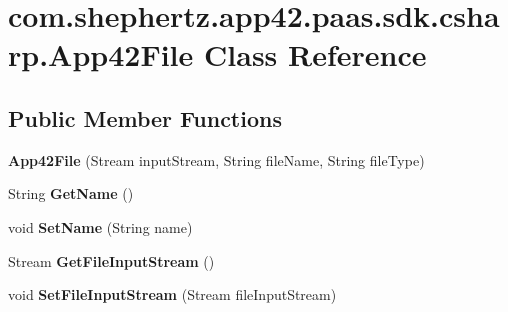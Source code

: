 \hypertarget{classcom_1_1shephertz_1_1app42_1_1paas_1_1sdk_1_1csharp_1_1_app42_file}{\section{com.\+shephertz.\+app42.\+paas.\+sdk.\+csharp.\+App42\+File Class Reference}
\label{classcom_1_1shephertz_1_1app42_1_1paas_1_1sdk_1_1csharp_1_1_app42_file}
}
\subsection*{Public Member Functions}
\begin{DoxyCompactItemize}
\item 
\hypertarget{classcom_1_1shephertz_1_1app42_1_1paas_1_1sdk_1_1csharp_1_1_app42_file_ae6442aefba536064724fbadf4730a787}{{\bfseries App42\+File} (Stream input\+Stream, String file\+Name, String file\+Type)}\label{classcom_1_1shephertz_1_1app42_1_1paas_1_1sdk_1_1csharp_1_1_app42_file_ae6442aefba536064724fbadf4730a787}

\item 
\hypertarget{classcom_1_1shephertz_1_1app42_1_1paas_1_1sdk_1_1csharp_1_1_app42_file_a3dc940cf54f21c4b96c21dd95cfa9ab0}{String {\bfseries Get\+Name} ()}\label{classcom_1_1shephertz_1_1app42_1_1paas_1_1sdk_1_1csharp_1_1_app42_file_a3dc940cf54f21c4b96c21dd95cfa9ab0}

\item 
\hypertarget{classcom_1_1shephertz_1_1app42_1_1paas_1_1sdk_1_1csharp_1_1_app42_file_a59de1fea1d6196c511ab444ae7215a81}{void {\bfseries Set\+Name} (String name)}\label{classcom_1_1shephertz_1_1app42_1_1paas_1_1sdk_1_1csharp_1_1_app42_file_a59de1fea1d6196c511ab444ae7215a81}

\item 
\hypertarget{classcom_1_1shephertz_1_1app42_1_1paas_1_1sdk_1_1csharp_1_1_app42_file_a9aeeba1f6d7ba71fb8e2e45cc7aae103}{Stream {\bfseries Get\+File\+Input\+Stream} ()}\label{classcom_1_1shephertz_1_1app42_1_1paas_1_1sdk_1_1csharp_1_1_app42_file_a9aeeba1f6d7ba71fb8e2e45cc7aae103}

\item 
\hypertarget{classcom_1_1shephertz_1_1app42_1_1paas_1_1sdk_1_1csharp_1_1_app42_file_a71c8a9cd09924cce9ecce595bc36e30d}{void {\bfseries Set\+File\+Input\+Stream} (Stream file\+Input\+Stream)}\label{classcom_1_1shephertz_1_1app42_1_1paas_1_1sdk_1_1csharp_1_1_app42_file_a71c8a9cd09924cce9ecce595bc36e30d}


\end{DoxyCompactItemize}

